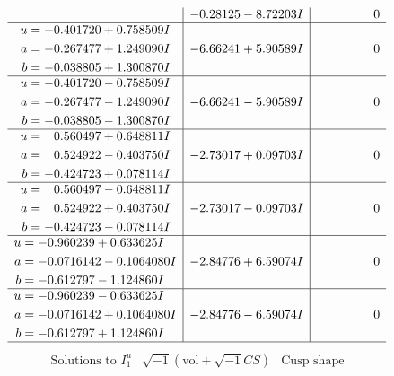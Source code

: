 \documentclass[1p]{elsarticle_modified}
\theoremstyle{definition}
\newcommand{\I}{\sqrt{-1}}
\begin{document}
$$\begin{array}{c|c|c}
 & -0.28125 - 8.72203 I & \phantom{-0.000000 } 0 \\ \hline\begin{aligned}
u &= -0.401720 + 0.758509 I \\
a &= -0.267477 + 1.249090 I \\
b &= -0.038805 + 1.300870 I\end{aligned}
 & -6.66241 + 5.90589 I & \phantom{-0.000000 } 0 \\ \hline\begin{aligned}
u &= -0.401720 - 0.758509 I \\
a &= -0.267477 - 1.249090 I \\
b &= -0.038805 - 1.300870 I\end{aligned}
 & -6.66241 - 5.90589 I & \phantom{-0.000000 } 0 \\ \hline\begin{aligned}
u &= \phantom{-}0.560497 + 0.648811 I \\
a &= \phantom{-}0.524922 - 0.403750 I \\
b &= -0.424723 + 0.078114 I\end{aligned}
 & -2.73017 + 0.09703 I & \phantom{-0.000000 } 0 \\ \hline\begin{aligned}
u &= \phantom{-}0.560497 - 0.648811 I \\
a &= \phantom{-}0.524922 + 0.403750 I \\
b &= -0.424723 - 0.078114 I\end{aligned}
 & -2.73017 - 0.09703 I & \phantom{-0.000000 } 0 \\ \hline\begin{aligned}
u &= -0.960239 + 0.633625 I \\
a &= -0.0716142 - 0.1064080 I \\
b &= -0.612797 - 1.124860 I\end{aligned}
 & -2.84776 + 6.59074 I & \phantom{-0.000000 } 0 \\ \hline\begin{aligned}
u &= -0.960239 - 0.633625 I \\
a &= -0.0716142 + 0.1064080 I \\
b &= -0.612797 + 1.124860 I\end{aligned}
 & -2.84776 - 6.59074 I & \phantom{-0.000000 } 0\\
 \hline 
 \end{array}$$\newpage$$\begin{array}{c|c|c}  
\text{Solutions to }I^u_{1}& \I (\text{vol} + \sqrt{-1}CS) & \text{Cusp shape}\\

\end{array}$$
\end{document}
